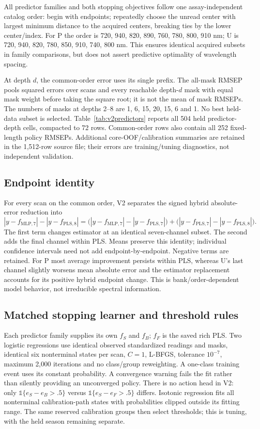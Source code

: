 \documentclass[10pt,a4paper]{article}
\begin{document}
All predictor families and both stopping objectives follow one assay-independent catalog order: begin with endpoints; repeatedly choose the unread center with largest minimum distance to the acquired centers, breaking ties by the lower center/index. For P the order is 720, 940, 820, 890, 760, 780, 800, 910 nm; U is 720, 940, 820, 780, 850, 910, 740, 800 nm. This ensures identical acquired subsets in family comparisons, but does not assert predictive optimality of wavelength spacing.

At depth $d$, the common-order error uses its single prefix. The all-mask RMSEP pools squared errors over scans and every reachable depth-$d$ mask with equal mask weight before taking the square root; it is not the mean of mask RMSEPs. The numbers of masks at depths 2--8 are 1, 6, 15, 20, 15, 6 and 1. No best held-data subset is selected. Table~\ref{tab:v2predictors} reports all 504 held predictor-depth cells, compacted to 72 rows. Common-order rows also contain all 252 fixed-length policy RMSEPs. Additional core-OOF/calibration summaries are retained in the 1,512-row source file; their errors are training/tuning diagnostics, not independent validation.

\subsection{Endpoint identity}
For every scan on the common order, V2 separates the signed hybrid absolute-error reduction into
\[
 |y-f_{\mathrm{MLP},7}|-|y-f_{\mathrm{PLS},8}|
 =\bigl(|y-f_{\mathrm{MLP},7}|-|y-f_{\mathrm{PLS},7}|\bigr)
 +\bigl(|y-f_{\mathrm{PLS},7}|-|y-f_{\mathrm{PLS},8}|\bigr).
\]
The first term changes estimator at an identical seven-channel subset. The second adds the final channel within PLS. Means preserve this identity; individual confidence intervals need not add endpoint-by-endpoint. Negative terms are retained. For P most average improvement persists within PLS, whereas U's last channel slightly worsens mean absolute error and the estimator replacement accounts for its positive hybrid endpoint change. This is bank/order-dependent model behavior, not irreducible spectral information.

\subsection{Matched stopping learner and threshold rules}
Each predictor family supplies its own $f_S$ and $f_B$; $f_F$ is the saved rich PLS. Two logistic regressions use identical observed standardized readings and masks, identical six nonterminal states per scan, $C=1$, L-BFGS, tolerance $10^{-7}$, maximum 2,000 iterations and no class/group reweighting. A one-class training event uses its constant probability. A convergence warning fails the fit rather than silently providing an unconverged policy. There is no action head in V2: only $\mathbb{1}\{e_S-e_B>.5\}$ versus $\mathbb{1}\{e_S-e_F>.5\}$ differs. Isotonic regression fits all nonterminal calibration-path states with probabilities clipped outside its fitting range. The same reserved calibration groups then select thresholds; this is tuning, with the held season remaining separate.
\end{document}
